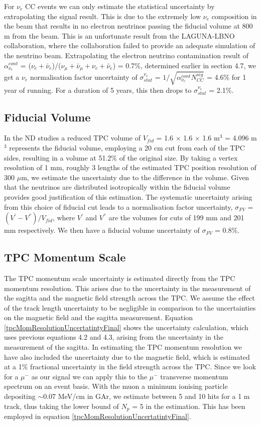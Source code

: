 For $\nu_{e}$ CC events we can only estimate the statistical uncertainty by extrapolating the signal result. This is due to the extremely low $\nu_{e}$ composition in the beam that results in no electron neutrinos passing the fiducial volume at 800 m from the beam. This is an unfortunate result from the LAGUNA-LBNO collaboration, where the collaboration failed to provide an adequate simulation of the neutrino beam. Extrapolating the electron neutrino contamination result of $\alpha_{\nu_{e}}^{cont}$ = ($\nu_{e} + \bar{\nu}_{e}$)/($\nu_{\mu} + \bar{\nu}_{\mu} + \nu_{e} + \bar{\nu}_{e}$) = 0.7\%, determined earlier in section 4.7, we get a $\nu_{e}$ normalisation factor uncertainty of $\sigma^{\nu_{e}}_{stat}$ = $1/\sqrt{\alpha_{\nu_{e}}^{cont}N^{sig}_{CC}}$ = 4.6\% for 1 year of running. For a duration of 5 years, this then drops to $\sigma^{\nu_{e}}_{stat}$ = 2.1\%.

\subsection{Fiducial Volume}
In the ND studies a reduced TPC volume of $V_{fid}$ = 1.6 $\times$ 1.6 $\times$ 1.6 m$^{3}$ = 4.096 m$^{3}$ represents the fiducial volume, employing a 20 cm cut from each of the TPC sides, resulting in a volume at 51.2\% of the original size. By taking a vertex resolution of 1 mm, roughly 3 lengths of the estimated TPC position resolution of 300 $\mu$m, we estimate the uncertainty due to the difference in the volume. Given that the neutrinos are distributed isotropically within the fiducial volume provides good justification of this estimation. The systematic uncertainty arising from this choice of fiducial cut leads to a normalisation factor uncertainty, $\sigma_{FV}$ = $(V^{'} - V^{''})/V_{fid}$, where $V^{'}$ and $V^{''}$ are the volumes for cuts of 199 mm and 201 mm respectively. We then have a fiducial volume uncertainty of $\sigma_{FV}$ = 0.8\%.

\subsection{TPC Momentum Scale}
The TPC momentum scale uncertainty is estimated directly from the TPC momentum resolution. This arises due to the uncertainty in the measurement of the sagitta and the magnetic field strength across the TPC. We assume the effect of the track length uncertainty to be negligible in comparison to the uncertainties on the magnetic field and the sagitta measurement. Equation \ref{tpcMomResolutionUncertatintyFinal} shows the uncertainty calculation, which uses previous equations 4.2 and 4.3, arising from the uncertainty in the measurement of the sagitta. In estimating the TPC momentum resolution we have also included the uncertainty due to the magnetic field, which is estimated at a 1\% fractional uncertainty in the field strength across the TPC. Since we look for a $\mu^{-}$ as our signal we can apply this to the $\mu^{-}$ transverse momentum spectrum on an event basis. With the muon a minimum ionising particle depositing $\sim$0.07 MeV/cm in GAr, we estimate between 5 and 10 hits for a 1 m track, thus taking the lower bound of $N_{p}$ = 5 in the estimation. This has been employed in equation \ref{tpcMomResolutionUncertatintyFinal}.

